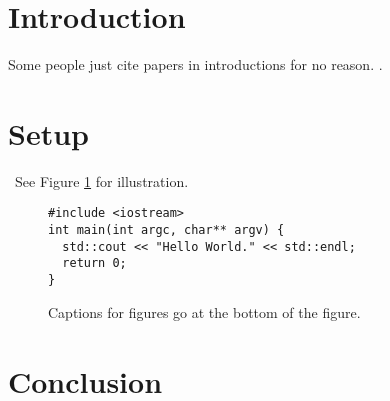 \section{Introduction}
Some people just cite papers in introductions for no reason.
\citet{ar49,pearson01,spe04}.

\section{Setup}
\label{sec:potent-outc-fram}
\blindmathtrue\blindtext\ See Figure \ref{fig:figure1} for illustration.
\begin{figure}[ht]
  \centering
\begin{verbatim}
#include <iostream>
int main(int argc, char** argv) {
  std::cout << "Hello World." << std::endl;
  return 0;
}
\end{verbatim}
  \caption{Captions for figures go at the bottom of the figure.}
  \label{fig:figure1}
\end{figure}

\section{Conclusion}
\blindmathfalse\blindtext[2]

